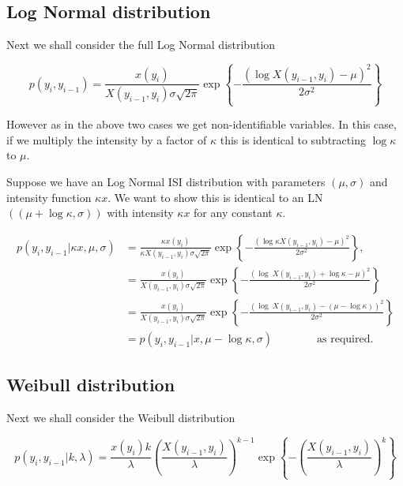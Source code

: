\documentclass[../main.tex]{subfiles}
\begin{document}
 \subsection{Log Normal distribution}
 Next we shall consider the full Log Normal distribution
 
 \begin{equation}
 p(y_i, y_{i-1}) = \frac{x(y_i)}{X(y_{i-1} , y_i ) \sigma \sqrt{2 \pi}} \exp \left\{ -\frac{(\log X(y_{i-1} , y_i ) - \mu)^2}{2\sigma^2} \right\}
 \end{equation}
 
 However as in the above two cases we get non-identifiable variables. In this case, if we multiply the intensity by a factor of $\kappa$ this is identical to subtracting $\log \kappa$ to $\mu$.\\
  {\color{blue}
   Suppose we have an Log Normal ISI distribution with parameters $(\mu,\sigma)$ and intensity function $\kappa x$. We want to show this is identical to an LN$((\mu + \log \kappa,\sigma))$ with intensity $\kappa x$ for any constant $\kappa$.
   
     \begin{align}
 p(y_i, y_{i-1}|\kappa x,\mu,\sigma) &= \frac{\kappa x(y_i)}{\kappa  X(y_{i-1} , y_i ) \sigma \sqrt{2 \pi}} \exp \left\{ -\frac{(\log\kappa  X(y_{i-1} , y_i ) - \mu)^2}{2\sigma^2} \right\},\\
 &=   \frac{ x(y_i)}{  X(y_{i-1} , y_i ) \sigma \sqrt{2 \pi}} \exp \left\{ -\frac{(\log\ X(y_{i-1} , y_i ) + \log \kappa - \mu)^2}{2\sigma^2} \right\}\\
 &=   \frac{ x(y_i)}{  X(y_{i-1} , y_i ) \sigma \sqrt{2 \pi}} \exp \left\{ -\frac{(\log\ X(y_{i-1} , y_i )  - (\mu - \log \kappa))^2}{2\sigma^2} \right\}\\
 &= p(y_i, y_{i-1}|x,\mu - \log \kappa,\sigma) \qquad \qquad \text{as required.}
 \end{align}
  }
  
 \subsection{Weibull distribution}
 Next we shall consider the Weibull distribution
 
 \begin{equation}
 p(y_i, y_{i-1}|k,\lambda) = \frac{x(y_i)k}{\lambda} \left( \frac{X(y_{i-1} , y_i )}{\lambda} \right)^{k-1} \exp \left\{ -\left( \frac{X(y_{i-1} , y_i )}{\lambda} \right)^k \right\}
 \end{equation}
 
\end{document}
